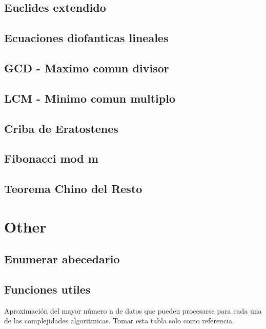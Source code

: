 \subsection{Euclides extendido}
\subsection{Ecuaciones diofanticas lineales}
\subsection{GCD - Maximo comun divisor}
\subsection{LCM - Minimo comun multiplo}
\subsection{Criba de Eratostenes}
\subsection{Fibonacci mod m}
\subsection{Teorema Chino del Resto}

\section{Other}
\subsection{Enumerar abecedario}
\subsection{Funciones utiles}


Aproximación del mayor número n de datos que pueden procesarse para cada una de las complejidades algoritmicas. Tomar esta tabla solo como referencia.

